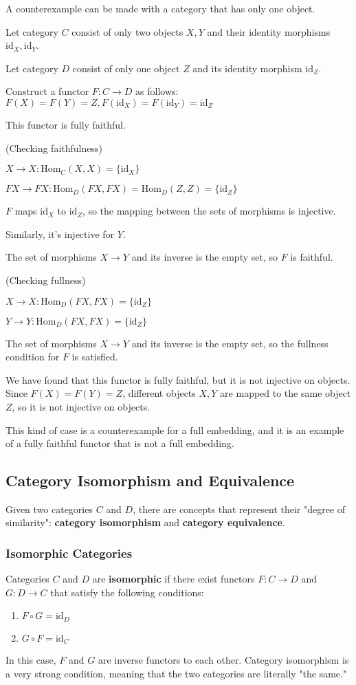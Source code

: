 \documentclass[uplatex,a4j,12pt,dvipdfmx]{jsarticle}
\begin{document}
A counterexample can be made with a category that has only one object.

Let category $C$ consist of only two objects $X,Y$ and their identity morphisms $\text{id}_{X}, \text{id}_{Y}$.

Let category $D$ consist of only one object $Z$ and its identity morphism $\text{id}_{Z}$.

Construct a functor $F:C \to D$ as follows:
$F(X)=F(Y)=Z, F(\text{id}_{X})=F(\text{id}_{Y})=\text{id}_{Z}$

This functor is fully faithful.

	{}

(Checking faithfulness)

$X \to X: \text{Hom}_{C}(X,X) = \{ \text{id}_{X} \}$

$FX \to FX: \text{Hom}_{D}(FX,FX) = \text{Hom}_{D}(Z,Z) = \{ \text{id}_{Z} \}$

$F$ maps $\text{id}_{X}$ to $\text{id}_{Z}$, so the mapping between the sets of morphisms is injective.

Similarly, it's injective for $Y$.

The set of morphisms $X \to Y$ and its inverse is the empty set, so $F$ is faithful.

	{}

(Checking fullness)

$X \to X: \text{Hom}_{D}(FX,FX) = \{ \text{id}_{Z} \}$

$Y \to Y: \text{Hom}_{D}(FX,FX) = \{ \text{id}_{Z} \}$

The set of morphisms $X \to Y$ and its inverse is the empty set, so the fullness condition for $F$ is satisfied.

We have found that this functor is fully faithful, but it is not injective on objects.
Since $F(X)=F(Y)=Z$, different objects $X,Y$ are mapped to the same object $Z$, so it is not injective on objects.

This kind of case is a counterexample for a full embedding,
and it is an example of a fully faithful functor that is not a full embedding.


\subsection{Category Isomorphism and Equivalence}
Given two categories $C$ and $D$, there are concepts that represent their "degree of similarity": \textbf{category isomorphism} and \textbf{category equivalence}.

\subsubsection{Isomorphic Categories}
Categories $C$ and $D$ are \textbf{isomorphic} if there exist functors $F: C \to D$ and $G: D \to C$ that satisfy the following conditions:
\begin{enumerate}
	\item $F \circ G = \mathrm{id}_D$
	\item $G \circ F = \mathrm{id}_C$
\end{enumerate}
In this case, $F$ and $G$ are inverse functors to each other. Category isomorphism is a very strong condition, meaning that the two categories are literally "the same."
\end{document}

